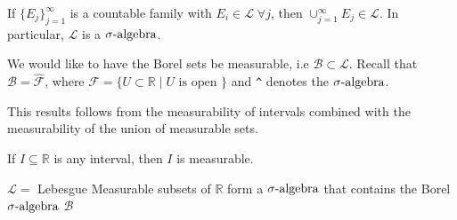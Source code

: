 \begin{prop}
    If $\{ E_j \}_{j=1}^{\infty}$ is a countable family with $E_i \in \mathcal{L} \; \forall j$, then $\cup_{j=1}^{\infty} E_j \in \mathcal{L}$.
    In particular, $\mathcal{L}$ is a $\sigma\text{-algebra}$.
\end{prop}

We would like to have the Borel sets be measurable, i.e  $\mathcal{B} \subset \mathcal{L}$.
Recall that $\mathcal{B} = \hat{\mathcal{F}}$, where $\mathcal{F} = \{ U \subset \mathbb{R} \mid U \text{ is open } \}$ and \verb!^! denotes the $\sigma\text{-algebra}$.

This results follows from the measurability of intervals combined with the measurability of the union of measurable sets.

\begin{prop}
    If $I \subseteq \mathbb{R}$ is any interval, then $I$ is measurable.
\end{prop}

\begin{theorem}
    $\mathcal{L} =$ Lebesgue Measurable subsets of $\mathbb{R}$ form a $\sigma\text{-algebra}$ that contains the Borel $\sigma\text{-algebra}$ $\mathcal{B}$
\end{theorem}

